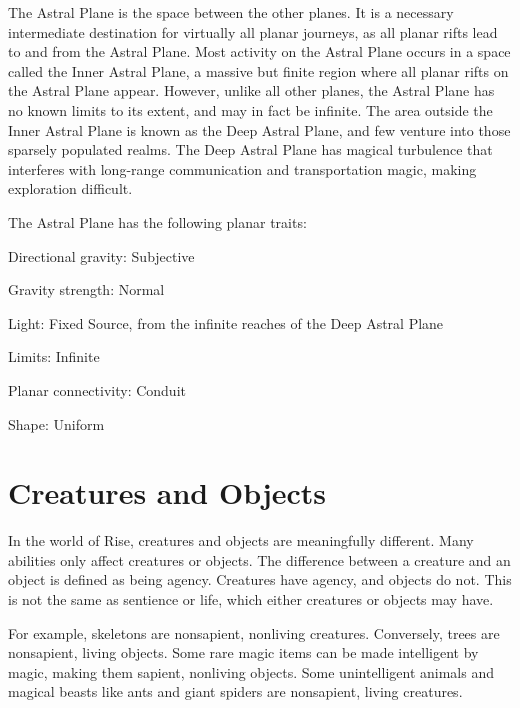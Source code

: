       The Astral Plane is the space between the other planes.
      It is a necessary intermediate destination for virtually all planar journeys, as all planar rifts lead to and from the Astral Plane.
      Most activity on the Astral Plane occurs in a space called the Inner Astral Plane, a massive but finite region where all planar rifts on the Astral Plane appear.
      However, unlike all other planes, the Astral Plane has no known limits to its extent, and may in fact be infinite.
      The area outside the Inner Astral Plane is known as the Deep Astral Plane, and few venture into those sparsely populated realms.
      The Deep Astral Plane has magical turbulence that interferes with long-range communication and transportation magic, making exploration difficult.

      The Astral Plane has the following planar traits:
      \begin{raggeditemize}
        \item Directional gravity: Subjective
        \item Gravity strength: Normal
        \item Light: Fixed Source, from the infinite reaches of the Deep Astral Plane
        \item Limits: Infinite
        \item Planar connectivity: Conduit
        \item Shape: Uniform
      \end{raggeditemize}

\section{Creatures and Objects}
  In the world of Rise, creatures and objects are meaningfully different.
  Many abilities only affect creatures or objects.
  The difference between a creature and an object is defined as being agency.
  Creatures have agency, and objects do not.
  This is not the same as sentience or life, which either creatures or objects may have.

  For example, skeletons are nonsapient, nonliving creatures.
  Conversely, trees are nonsapient, living objects.
  Some rare magic items can be made intelligent by magic, making them sapient, nonliving objects.
  Some unintelligent animals and magical beasts like ants and giant spiders are nonsapient, living creatures.

